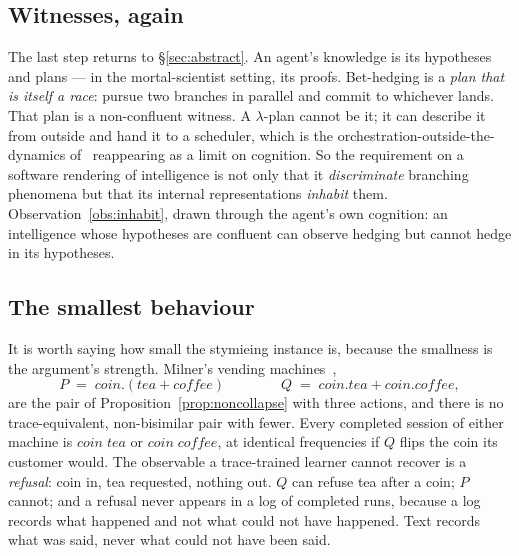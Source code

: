 \documentclass[11pt]{article}
\theoremstyle{plain}
\theoremstyle{definition}
\theoremstyle{remark}
\begin{document}
\subsection{Witnesses, again}

The last step returns to \S\ref{sec:abstract}. An agent's knowledge is its
hypotheses and plans --- in the mortal-scientist setting, its proofs.
Bet-hedging is a \emph{plan that is itself a race}: pursue two branches in
parallel and commit to whichever lands. That plan is a non-confluent witness.
A $\lambda$-plan cannot be it; it can describe it from outside and hand it to
a scheduler, which is the orchestration-outside-the-dynamics of~\cite{ProofSearch}
reappearing as a limit on cognition. So the requirement on a software
rendering of intelligence is not only that it \emph{discriminate} branching
phenomena but that its internal representations \emph{inhabit} them.
Observation~\ref{obs:inhabit}, drawn through the agent's own cognition: an
intelligence whose hypotheses are confluent can observe hedging but cannot
hedge in its hypotheses.

\subsection{The smallest behaviour}\label{sec:smallest}

It is worth saying how small the stymieing instance is, because the
smallness is the argument's strength. Milner's vending
machines~\cite{MilnerCCS},
\[
P \;=\; \mathit{coin}.(\mathit{tea} + \mathit{coffee})
\qquad\qquad
Q \;=\; \mathit{coin}.\mathit{tea} + \mathit{coin}.\mathit{coffee},
\]
are the pair of Proposition~\ref{prop:noncollapse} with three actions, and
there is no trace-equivalent, non-bisimilar pair with fewer. Every completed
session of either machine is $\mathit{coin}\;\mathit{tea}$ or
$\mathit{coin}\;\mathit{coffee}$, at identical frequencies if $Q$ flips the
coin its customer would. The observable a trace-trained learner cannot
recover is a \emph{refusal}: coin in, tea requested, nothing out. $Q$ can
refuse tea after a coin; $P$ cannot; and a refusal never appears in a log of
completed runs, because a log records what happened and not what could not
have happened. Text records what was said, never what could not have been
said.
\end{document}
